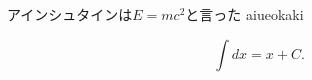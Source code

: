 \documentclass{ltjsarticle}
\begin{document}
  アインシュタインは$E=mc^2$と言った
  aiueokaki

  \[ \int dx = x + C. \]
\end{document}
